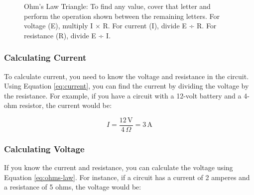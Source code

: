 \begin{figure}[h]
    \centering
    \caption{Ohm's Law Triangle: To find any value, cover that letter and perform the operation shown between the remaining letters. For voltage (E), multiply I × R. For current (I), divide E ÷ R. For resistance (R), divide E ÷ I.}
    \label{fig:ohms-law-triangle}
\end{figure}

\subsubsection*{Calculating Current}
To calculate current, you need to know the voltage and resistance in the circuit. Using Equation \ref{eq:current}, you can find the current by dividing the voltage by the resistance. For example, if you have a circuit with a 12-volt battery and a 4-ohm resistor, the current would be:

\[
I = \frac{12\,\text{V}}{4\,\Omega} = 3\,\text{A}
\]

\subsubsection*{Calculating Voltage}
If you know the current and resistance, you can calculate the voltage using Equation \ref{eq:ohms-law}. For instance, if a circuit has a current of 2 amperes and a resistance of 5 ohms, the voltage would be:

